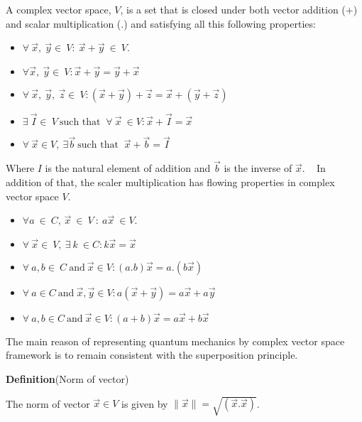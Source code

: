 \begin{defn}


A complex vector space, $V$, is a set that is closed under both vector addition
($ +$) and scalar multiplication (.) and satisfying all this following properties:
\begin{itemize}
\item $\forall~ \vec{x},~\vec{y} \in ~ V : ~\vec{x}+\vec{y} ~\in~ V $.
\item $\forall \vec{x},~\vec{y} \in ~ V : \vec{x}+\vec{y}=\vec{y}+\vec{x}$
\item $\forall~ \vec{x},~\vec{y}, ~\vec{z} \in ~ V:\left(\vec{x}+\vec{y}\right)+\vec{z}=\vec{x}+\left(\vec{y}+\vec{z}\right)$
\item $\exists ~\vec{I} \in ~V~ \text{such that }~  \forall~ \vec{x} ~\in  V: \vec{x}+\vec{I}=\vec{x}$
\item $\forall ~\vec{x} \in V,~ \exists \vec{b} ~ \text{such that }  ~\vec{x}+\vec{b}= \vec{I}$
\end{itemize}
Where $I$ is the natural element of addition and $\vec{b}$ is the inverse of $\vec{x}$. ~
In addition  of that, the scaler  multiplication has flowing properties in complex vector space $V$.
\begin{itemize}
\item $\forall a~\in ~C$, $\vec{x}~\in ~V~ :~ a\vec{x}~ \in V$.
\item $\forall ~\vec{x} \in ~V,~ \exists~ k ~\in C :k\vec{x}=\vec{x}$
\item $\forall ~ a,b \in ~C ~\text{and} ~ \vec{x}\in V :\left(a.b\right) \vec{x}=a.\left(b \vec{x}\right)$
\item $\forall ~ a \in C ~\text{and} ~ \vec{x}, \vec{y}\in V:a\left(\vec{x}+\vec{y}\right)=a\vec{x}+a\vec{y}$
\item $\forall ~ a,b \in C ~\text{and} ~ \vec{x}\in V:\left(a+b\right)\vec{x}=a\vec{x}+b\vec{x}$
\end{itemize}
\end{defn}

The main reason of representing quantum mechanics by complex  vector space framework is to remain consistent with the superposition principle.

\textbf{Definition}{(Norm of vector)}

The norm of vector $\vec{x} \in V$ is given by $\| \vec{x}\|=\sqrt{\left(\vec{x}.\vec{x}\right)}$.

